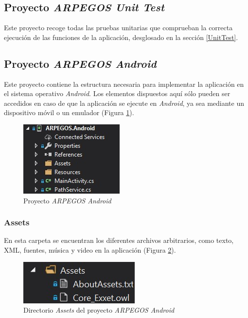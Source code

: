 {\subsection{Proyecto \textit{ARPEGOS Unit Test}}
Este proyecto recoge todas las pruebas unitarias que comprueban la correcta ejecución de las funciones de la aplicación,
desglosado en la sección \ref*{UnitTest}.
\subsection{Proyecto \textit{ARPEGOS Android}}
Este proyecto contiene la estructura necesaria para implementar la aplicación en el sistema operativo \textit{Android}. Los 
elementos dispuestos aquí sólo pueden ser accedidos en caso de que la aplicación se ejecute en \textit{Android}, ya sea 
mediante un dispositivo móvil o un emulador (Figura \ref*{ARPEGOSAndroid}).

\begin{figure}[H]
    \centering
    \includegraphics[scale=1.5]{Images/ARPEGOS_Android.jpg}
    \caption{Proyecto \textit{ARPEGOS Android}}
    \label{ARPEGOSAndroid}    
\end{figure}

\subsubsection{Assets}
En esta carpeta se encuentran los diferentes archivos arbitrarios, como texto, XML, fuentes, música y video en la 
aplicación (Figura \ref*{AssetsAndroid}).

\begin{figure}[H]
    \centering
    \includegraphics[scale=1.5]{Images/ARPEGOS_Android_Assets.jpg}
    \caption{Directorio \textit{Assets} del proyecto \textit{ARPEGOS Android}}
    \label{AssetsAndroid}    
\end{figure}
\newpage
}
